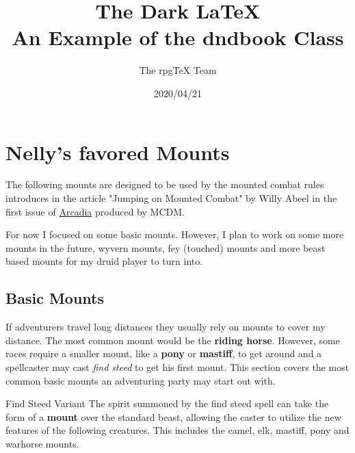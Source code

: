 \documentclass[letterpaper,twocolumn,openany,nodeprecatedcode]{dndbook}
\title{The Dark \LaTeX{} \\
\large An Example of the dndbook Class}
\author{The rpgTeX Team}
\date{2020/04/21}
\begin{document}
\frontmatter



\mainmatter

\chapter{Nelly's favored Mounts}

The following mounts are designed to be used by the mounted combat rules introduces in the article "Jumping on Mounted Combat" by Willy Abeel in the first issue of \href{https://www.youtube.com/watch?v=oid4QMMXjfs}{Arcadia} produced by MCDM.

For now I focused on some basic mounts. However, I plan to work on some more mounts in the future, wyvern mounts, fey (touched) mounts and more beast based mounts for my druid player to turn into.

\section{Basic Mounts}

If adventurers travel long distances they usually rely on mounts to cover my distance. The most common mount would be the \textbf{riding horse}. However, some races require a smaller mount, like a \textbf{pony} or \textbf{mastiff}, to get around and a spellcaster may cast \textit{find steed} to get his first mount. This section covers the most common basic mounts an adventuring party may start out with.

\begin{DndComment}{Find Steed Variant}
    The spirit summoned by the find steed spell can take the form of a \textbf{mount} over the standard beast, allowing the caster to utilize the new features of the following creatures. This includes the camel, elk, mastiff, pony and warhorse mounts.
\end{DndComment}
\end{document}
